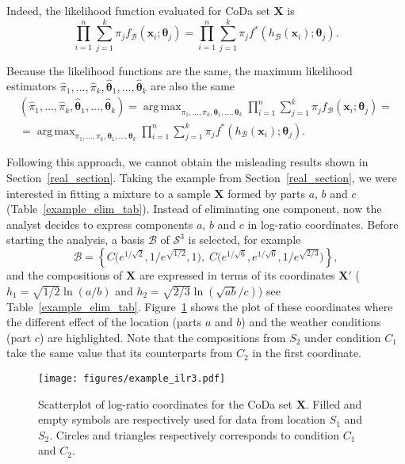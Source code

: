 \documentclass[12pt, a4paper]{article}
\newcommand{\m}[1]{\boldsymbol{#1}}
\DeclareMathOperator*{\argmax}{arg\,max}
\begin{document}
Indeed, the likelihood function evaluated for CoDa set $\mathbf{X}$ is
\begin{equation}\label{likeli1}
\prod_{i=1}^n \sum_{j=1}^k \pi_j f_\mathcal{B}(\textbf{x}_i; \m\theta_j)=\prod_{i=1}^n \sum_{j=1}^k \pi_j f^*(h_\mathcal{B}(\textbf{x}_i); \m\theta_j).
\end{equation}

Because the likelihood functions are the same,  the maximum likelihood estimators $\hat{\pi}_1, \dots, \hat{\pi}_k, \hat{\m\theta}_1, \dots, \hat{\m\theta}_k$ are also the same
\begin{eqnarray}\label{likeli2}
\left( \hat{\pi}_1, \dots, \hat{\pi}_k, \hat{\m\theta}_1, \dots, \hat{\m\theta}_k\right) = \argmax_{\pi_1, \dots, \pi_k, \m\theta_1, \dots, \m\theta_k} \prod_{i=1}^n \sum_{j=1}^k \pi_j f_\mathcal{B}(\textbf{x}_i; \m\theta_j) = \\ 
= \argmax_{\pi_1, \dots, \pi_k, \m\theta_1, \dots, \m\theta_k} \prod_{i=1}^n \sum_{j=1}^k \pi_j f^*(h_\mathcal{B}(\textbf{x}_i); \m\theta_j).
\end{eqnarray}


Following this approach, we cannot obtain the misleading results shown in Section~\ref{real_section}. Taking the example from Section~\ref{real_section}, we were interested in fitting a mixture to a sample $\mathbf{X}$ formed by parts $a$, $b$ and $c$ (Table~\ref{example_elim_tab}). Instead of eliminating one component, now the analyst decides to express components $a$, $b$ and $c$ in log-ratio coordinates. Before starting the analysis, a basis $\mathcal{B}$ of $\mathcal{S}^3$ is selected, for example
\[
\mathcal{B} = \left\{ C\Big( e^{1/\sqrt{2}}, 1/e^{\sqrt{1/2}}, 1 \Big), \; C\Big( e^{1/\sqrt{6}}, e^{1/\sqrt{6}}, 1/e^{\sqrt{2/3}} \Big) \right\},
\]
and the compositions of $\mathbf{X}$ are expressed in terms of its coordinates 
$\mathbf{X}'$ ($h_1 = \sqrt{1/2} \ln(a/b)$ and $h_2 = \sqrt{2/3} \ln(\sqrt{ab} / c)$) see Table~\ref{example_elim_tab}. Figure~\ref{example_ilr3} shows the plot of these coordinates where the different effect of the location (parts $a$ and $b$) and the weather conditions (part $c$) are highlighted. Note that the compositions from $S_2$ under condition $C_1$ take the same value that its counterparts from $C_2$ in the first coordinate. 



\begin{figure}[thbp]
\centering
\texttt{[image: figures/example\_ilr3.pdf]}
\caption{Scatterplot of log-ratio coordinates for the CoDa set $\mathbf{X}$. Filled and empty symbols are respectively used for data from location $S_1$ and $S_2$. Circles and triangles respectively corresponds to condition $C_1$ and $C_2$.}\label{example_ilr3}
\end{figure}
\end{document}
